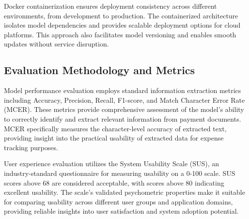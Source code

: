 Docker containerization ensures deployment consistency across different environments, from development to production. The containerized architecture isolates model dependencies and provides scalable deployment options for cloud platforms. This approach also facilitates model versioning and enables smooth updates without service disruption.

\subsection{Evaluation Methodology and Metrics}
Model performance evaluation employs standard information extraction metrics including Accuracy, Precision, Recall, F1-score, and Match Character Error Rate (MCER). These metrics provide comprehensive assessment of the model's ability to correctly identify and extract relevant information from payment documents. MCER specifically measures the character-level accuracy of extracted text, providing insight into the practical usability of extracted data for expense tracking purposes.

User experience evaluation utilizes the System Usability Scale (SUS), an industry-standard questionnaire for measuring usability on a 0-100 scale. SUS scores above 68 are considered acceptable, with scores above 80 indicating excellent usability. The scale's validated psychometric properties make it suitable for comparing usability across different user groups and application domains, providing reliable insights into user satisfaction and system adoption potential.